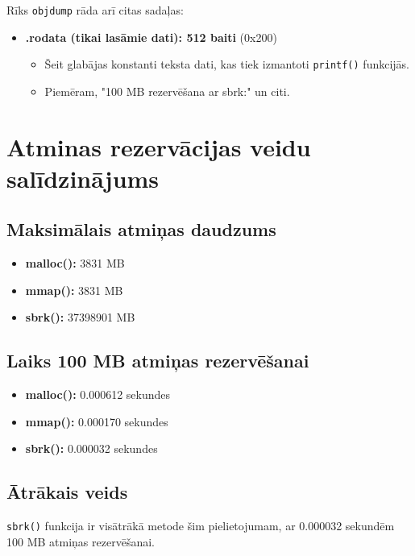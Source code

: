 \documentclass{report}
\begin{document}
	Rīks \texttt{objdump} rāda arī citas sadaļas:
	
	\begin{itemize}
	\item \textbf{.rodata (tikai lasāmie dati): 512 baiti} (0x200)
	\begin{itemize}
		\item Šeit glabājas konstanti teksta dati, kas tiek izmantoti \texttt{printf()} funkcijās.
		\item Piemēram, "100 MB rezervēšana ar sbrk:" un citi.
	\end{itemize}
	\end{itemize}
	
	\section{Atminas rezervācijas veidu salīdzinājums}
	
	\subsection{Maksimālais atmiņas daudzums}
	
	\begin{itemize}
	\item \textbf{malloc():} 3831 MB
	\item \textbf{mmap():} 3831 MB
	\item \textbf{sbrk():} 37398901 MB
	\end{itemize}
	
	\subsection{Laiks 100 MB atmiņas rezervēšanai}
	
	\begin{itemize}
	\item \textbf{malloc():} 0.000612 sekundes
	\item \textbf{mmap():} 0.000170 sekundes
	\item \textbf{sbrk():} 0.000032 sekundes
	\end{itemize}
	
	\subsection{Ātrākais veids}
	
	\texttt{sbrk()} funkcija ir visātrākā metode šim pielietojumam, ar 0.000032 sekundēm 100 MB atmiņas rezervēšanai.
	
\end{document}
